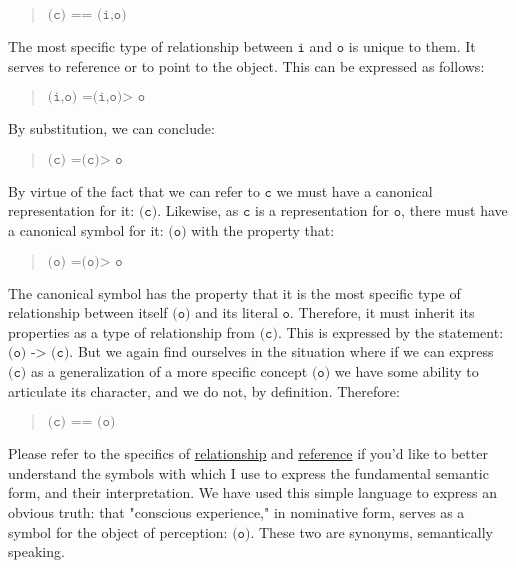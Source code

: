 \documentclass[runningheads]{llncs}
\begin{document}
\begin{quote}
$\texttt{(c) == (i,o)}$
\end{quote}

The most specific type of relationship between $\texttt{i}$ and $\texttt{o}$ is unique to them. It serves to reference or to point to the object. This can be expressed as follows:

\begin{quote}
$\texttt{(i,o) =(i,o)> o}$
\end{quote}

By substitution, we can conclude:

\begin{quote}
$\texttt{(c) =(c)> o}$
\end{quote}

By virtue of the fact that we can refer to $\texttt{c}$ we must have a canonical representation for it: $\texttt{(c)}$. Likewise, as $\texttt{c}$ is a representation for $\texttt{o}$, there must have a canonical symbol for it: $\texttt{(o)}$ with the property that:

\begin{quote}
$\texttt{(o) =(o)> o}$
\end{quote}

The canonical symbol has the property that it is the most specific type of relationship between itself $\texttt{(o)}$ and its literal $\texttt{o}$. Therefore, it must inherit its properties as a type of relationship from $\texttt{(c)}$. This is expressed by the statement: $\texttt{(o) -> (c)}$. But we again find ourselves in the situation where if we can express $\texttt{(c)}$ as a generalization of a more specific concept $\texttt{(o)}$ we have some ability to articulate its character, and we do not, by definition. Therefore:

\begin{quote}
$\texttt{(c) == (o)}$
\end{quote}

Please refer to the specifics of \href{https://dna-platform.github.io/inexplicable-phenomena/encyclopedia/relationship.html}{relationship}\xspace and \href{https://dna-platform.github.io/inexplicable-phenomena/encyclopedia/reference.html}{reference}\xspace if you'd like to better understand the symbols with which I use to express the fundamental semantic form, and their interpretation. We have used this simple language to express an obvious truth: that "conscious experience," in nominative form, serves as a symbol for the object of perception: $\texttt{(o)}$. These two are synonyms, semantically speaking.
\end{document}
